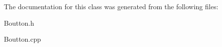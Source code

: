 \-The documentation for this class was generated from the following files\-:\begin{DoxyCompactItemize}
\item 
\-Boutton.\-h\item 
\-Boutton.\-cpp\end{DoxyCompactItemize}
